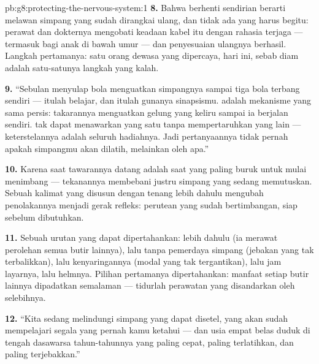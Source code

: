 \begin{solution}{pb:g8:protecting-the-nervous-system:1}
\textbf{8.} Bahwa berhenti sendirian berarti melawan simpang
yang sudah dirangkai ulang, dan tidak ada yang harus
begitu: perawat dan dokternya mengobati keadaan kabel itu
dengan rahasia terjaga --- termasuk bagi anak di bawah umur
--- dan penyesuaian ulangnya berhasil. Langkah pertamanya:
satu orang dewasa yang dipercaya, hari ini, sebab diam
adalah satu-satunya langkah yang kalah.

\textbf{9.} ``Sebulan menyulap bola menguatkan simpangnya
sampai tiga bola terbang sendiri --- itulah belajar, dan
itulah gunanya sinapsismu.  adalah mekanisme yang
sama persis: takarannya menguatkan gelung yang keliru sampai
ia berjalan sendiri.  tak dapat menawarkan yang satu
tanpa mempertaruhkan yang lain --- keterstelannya adalah
seluruh hadiahnya. Jadi pertanyaannya tidak pernah apakah
simpangmu akan dilatih, melainkan oleh apa.''

\textbf{10.} Karena saat tawarannya datang adalah saat yang
paling buruk untuk mulai menimbang --- tekanannya membebani
justru simpang yang sedang memutuskan. Sebuah kalimat yang
disusun dengan tenang lebih dahulu mengubah penolakannya
menjadi gerak refleks: perutean yang sudah bertimbangan,
siap sebelum dibutuhkan.

\textbf{11.} Sebuah urutan yang dapat dipertahankan: 
lebih dahulu (ia merawat perolehan semua butir lainnya),
lalu tanpa pemerdaya simpang (jebakan yang tak
terbalikkan), lalu kenyaringannya (modal yang tak
tergantikan), lalu jam layarnya, lalu helmnya. Pilihan
pertamanya dipertahankan: manfaat setiap butir lainnya
dipadatkan semalaman --- tidurlah perawatan yang
disandarkan oleh selebihnya.

\textbf{12.} ``Kita sedang melindungi simpang yang dapat
disetel, yang akan sudah mempelajari segala yang pernah kamu
ketahui --- dan usia empat belas duduk di tengah dasawarsa
tahun-tahunnya yang paling cepat, paling terlatihkan, dan
paling terjebakkan.''
\end{solution}
